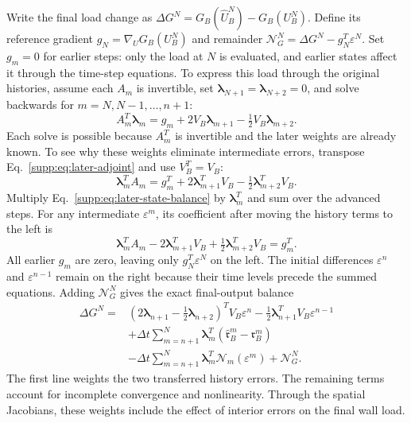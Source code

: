 \documentclass[11pt,a4paper]{article}
\newcommand{\eps}{\varepsilon}
\begin{document}
Write the final load change as $\Delta G^N=G_B(\widehat U_B^N)-G_B(U_B^N)$. Define its reference gradient $g_N=\nabla_U G_B(U_B^N)$ and remainder $\mathcal N_G^N=\Delta G^N-g_N^T\eps^N$. Set $g_m=0$ for earlier steps: only the load at $N$ is evaluated, and earlier states affect it through the time-step equations. To express this load through the original histories, assume each $A_m$ is invertible, set $\boldsymbol\lambda_{N+1}=\boldsymbol\lambda_{N+2}=0$, and solve backwards for $m=N,N-1,\ldots,n+1$:
\begin{equation}
 A_m^T\boldsymbol\lambda_m=g_m+2V_B\boldsymbol\lambda_{m+1}
                      -\tfrac12 V_B\boldsymbol\lambda_{m+2}.
 \label{supp:eq:later-adjoint}
\end{equation}
Each solve is possible because $A_m^T$ is invertible and the later weights are already known. To see why these weights eliminate intermediate errors, transpose Eq.~\eqref{supp:eq:later-adjoint} and use $V_B^T=V_B$:
\[
 \boldsymbol\lambda_m^TA_m
 =g_m^T+2\boldsymbol\lambda_{m+1}^TV_B
          -\tfrac12\boldsymbol\lambda_{m+2}^TV_B.
\]
Multiply Eq.~\eqref{supp:eq:later-state-balance} by $\boldsymbol\lambda_m^T$ and sum over the advanced steps. For any intermediate $\eps^m$, its coefficient after moving the history terms to the left is
\[
 \boldsymbol\lambda_m^TA_m-2\boldsymbol\lambda_{m+1}^TV_B
             +\tfrac12\boldsymbol\lambda_{m+2}^TV_B=g_m^T.
\]
All earlier $g_m$ are zero, leaving only $g_N^T\eps^N$ on the left. The initial differences $\eps^n$ and $\eps^{n-1}$ remain on the right because their time levels precede the summed equations. Adding $\mathcal N_G^N$ gives the exact final-output balance
\begin{equation}
\begin{aligned}
 \Delta G^N={}&
 (2\boldsymbol\lambda_{n+1}-\tfrac12\boldsymbol\lambda_{n+2})^T V_B\eps^n
 -\tfrac12\boldsymbol\lambda_{n+1}^T V_B\eps^{n-1}\\
 &+\Delta t\sum_{m=n+1}^{N}\boldsymbol\lambda_m^T
      (\widehat{\mathfrak r}_B^m-\mathfrak r_B^m)\\
 &-\Delta t\sum_{m=n+1}^{N}\boldsymbol\lambda_m^T\mathcal N_m(\eps^m)
   +\mathcal N_G^N.
\end{aligned}
\label{supp:eq:later-output-balance}
\end{equation}
The first line weights the two transferred history errors. The remaining terms account for incomplete convergence and nonlinearity. Through the spatial Jacobians, these weights include the effect of interior errors on the final wall load.
\end{document}
